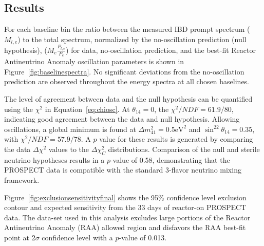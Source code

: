 \subsection{Results}

For each baseline bin the ratio between the measured IBD prompt spectrum ($M_{l,e}$) to the total spectrum, normalized by the no-oscillation prediction (null hypothesis), ($M_e\frac{P_{l,e}}{P_e}$) for data, no-oscillation prediction, and the best-fit Reactor Antineutrino Anomaly oscillation parameters is shown in Figure~\ref{fig:baselinespectra}.
No significant deviations from the no-oscillation prediction are observed throughout the energy spectra at all chosen baselines.

The level of agreement between data and the null hypothesis can be quantified using the $\chi^2$ in Equation~\ref{eq:chiosc}.
At $\theta_{14} = 0$, the $\chi^2/NDF = 61.9/80$, indicating good agreement between the data and null hypothesis.
Allowing oscillations, a global minimum is found at $\Delta m^2_{41} = 0.5 \textrm{eV}^2$ and $\sin^22\theta_{14} = 0.35$, with $\chi^2/NDF = 57.9/78$.
A $p$ value for these results is generated by comparing the data $\Delta\chi^2$ values to the $\Delta\chi^2_C$ distributions. 
Comparison of the null and sterile neutrino hypotheses results in a $p$-value of 0.58, demonstrating that the PROSPECT data is compatible with the standard 3-flavor neutrino mixing framework.

Figure~\ref{fig:exclusionsensitivityfinal} shows the 95\% confidence level exclusion contour and expected sensitivity from the 33 days of reactor-on PROSPECT data.
The data-set used in this analysis excludes large portions of the Reactor Antineutrino Anomaly (RAA) allowed region and disfavors the RAA best-fit point at 2$\sigma$ confidence level with a $p$-value of 0.013.


